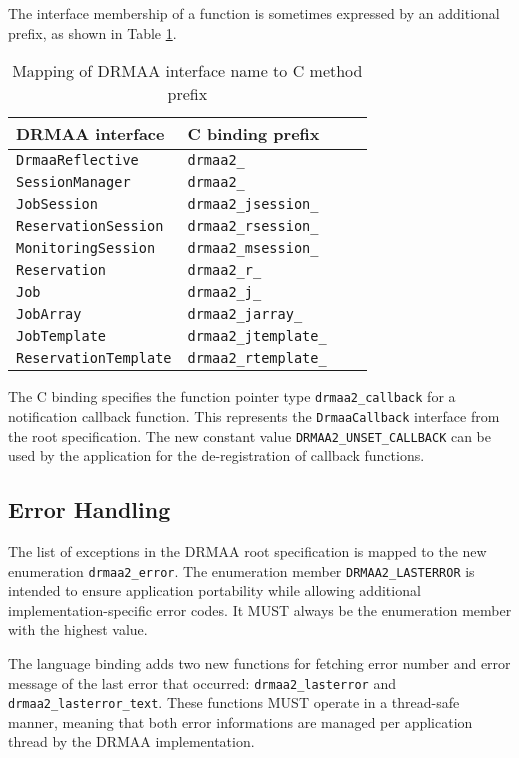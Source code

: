 \documentclass{article}
\newcommand{\h}[1]{\texttt{#1}}
\begin{document}
The interface membership of a function is sometimes expressed by an additional prefix, as shown in Table \ref{tab:naming}.

\begin{table}[ht]
\centering
\begin{tabularx}{\textwidth}{|X|X|l|X|}
\hline
DRMAA interface & C binding prefix \\
\hline
\h{DrmaaReflective} & \h{drmaa2\_} \\
\h{SessionManager} & \h{drmaa2\_} \\
\h{JobSession} & \h{drmaa2\_jsession\_} \\
\h{ReservationSession} & \h{drmaa2\_rsession\_} \\
\h{MonitoringSession}  & \h{drmaa2\_msession\_} \\
\h{Reservation} & \h{drmaa2\_r\_} \\
\h{Job} & \h{drmaa2\_j\_} \\
\h{JobArray} & \h{drmaa2\_jarray\_} \\
\h{JobTemplate} & \h{drmaa2\_jtemplate\_} \\
\h{ReservationTemplate} & \h{drmaa2\_rtemplate\_} \\
\hline
\end{tabularx}
\caption{Mapping of DRMAA interface name to C method prefix}
\label{tab:naming}
\end{table}

The C binding specifies the function pointer type \h{drmaa2\_callback} for a notification callback function. This represents the \h{DrmaaCallback} interface from the root specification. The new constant value \h{DRMAA2\_UNSET\_CALLBACK} can be used by the application for the de-registration of callback functions.

\subsection{Error Handling}

The list of exceptions in the DRMAA root specification is mapped to the new enumeration \h{drmaa2\_error}. The enumeration member \h{DRMAA2\_LASTERROR} is intended to ensure application portability while allowing additional implementation-specific error codes. It MUST always be the enumeration member with the highest value.

The language binding adds two new functions for fetching error number and error message of the last error that occurred: \h{drmaa2\_lasterror} and \h{drmaa2\_lasterror\_text}. These functions MUST operate in a thread-safe manner, meaning that both error informations are managed per application thread by the DRMAA implementation.
\end{document}
